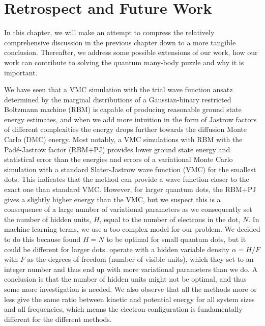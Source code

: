 \chapter{Retrospect and Future Work} \label{sec:conclusion}
In this chapter, we will make an attempt to compress the relatively comprehensive discussion in the previous chapter down to a more tangible conclusion. Thereafter, we address some possible extensions of our work, how our work can contribute to solving the quantum many-body puzzle and why it is important. 

We have seen that a VMC simulation with the trial wave function ansatz determined by the marginal distributions of a Gaussian-binary restricted Boltzmann machine (RBM) is capable of producing reasonable ground state energy estimates, and when we add more intuition in the form of Jastrow factors of different complexities the energy drops further towards the diffusion Monte Carlo (DMC) energy. Most notably, a VMC simulations with RBM with the Padé-Jastrow factor (RBM+PJ) provides lower ground state energy and statistical error than the energies and errors of a variational Monte Carlo simulation with a standard Slater-Jastrow wave function (VMC) for the smallest dots. This indicates that the method can provide a wave function closer to the exact one than standard VMC. However, for larger quantum dots, the RBM+PJ gives a slightly higher energy than the VMC, but we suspect this is a consequence of a large number of variational parameters as we consequently set the number of hidden units, $H$, equal to the number of electrons in the dot, $N$. In machine learning terms, we use a too complex model for our problem. We decided to do this because \citet{nordhagen_computational_2018} found $H=N$ to be optimal for small quantum dots, but it could be different for larger dots. \citet{carleo_solving_2017} operate with a hidden variable density $\alpha=H/F$ with $F$ as the degrees of freedom (number of visible units), which they set to an integer number and thus end up with more variational parameters than we do. A conclusion is that the number of hidden units might not be optimal, and thus some more investigation is needed. We also observe that all the methods more or less give the same ratio between kinetic and potential energy for all system sizes and all frequencies, which means the electron configuration is fundamentally different for the different methods.

